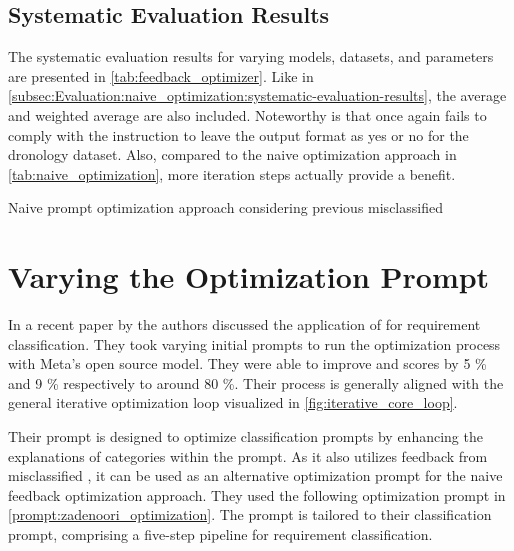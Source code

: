 \subsection{Systematic Evaluation Results}
\label{subsec:Evaluation:simple_feedback_optimization:systematic-evaluation-results}

The systematic evaluation results for varying models, datasets, and parameters are presented in \autoref{tab:feedback_optimizer}.
Like in \autoref{subsec:Evaluation:naive_optimization:systematic-evaluation-results}, the average and weighted average are also included.
Noteworthy is that \llama once again fails to comply with the instruction to leave the output format as \textquotesingle yes \textquotesingle or \textquotesingle no \textquotesingle for the dronology dataset. 
Also, compared to the naive optimization approach in \autoref{tab:naive_optimization}, more iteration steps actually provide a benefit.

\begin{landscape}
    \begin{table}
        \centering
        \renewcommand{\arraystretch}{1}
        
        \renewcommand{\arraystretch}{1}
        \caption{Naive prompt optimization approach considering previous misclassified \TLs}
        \label{tab:feedback_optimizer}
    \end{table}
\end{landscape}


\section{Varying the Optimization Prompt}
\label{sec:Evaluation:varying-the-optimization-prompt}
In a recent paper by  the authors discussed the application of \APE for requirement classification.
They took varying initial prompts to run the optimization process with Meta's open source \llama model.
They were able to improve \fone and \ftwo scores by 5 \% and 9 \% respectively to around 80 \%.
Their \APE process is generally aligned with the general iterative optimization loop visualized in \autoref{fig:iterative_core_loop}.

Their prompt is designed to optimize classification prompts by enhancing the explanations of categories within the prompt.
As it also utilizes feedback from misclassified \TLs, it can be used as an alternative optimization prompt for the naive feedback optimization approach.
They used the following optimization prompt in \autoref{prompt:zadenoori_optimization}.
The prompt is tailored to their \CoT classification prompt, comprising a five-step pipeline for requirement classification.

